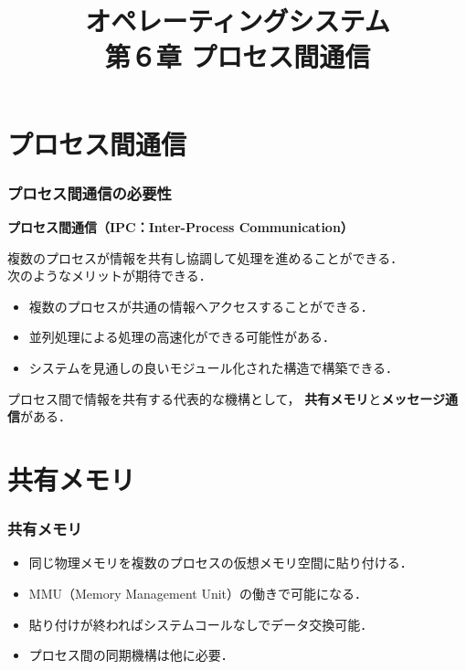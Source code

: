 \documentclass{beamer}                   %
\begin{document}
\title[OS]{オペレーティングシステム\\第６章 プロセス間通信}
\date{}

\begin{frame}
  \titlepage
\end{frame}


\section{プロセス間通信}
\begin{frame}
  \frametitle{プロセス間通信の必要性}

{\bf プロセス間通信（IPC：Inter-Process Communication）}

複数のプロセスが情報を共有し協調して処理を進めることができる．\\
次のようなメリットが期待できる．

\begin{itemize}
\item 複数のプロセスが共通の情報へアクセスすることができる．
\item 並列処理による処理の高速化ができる可能性がある．
\item システムを見通しの良いモジュール化された構造で構築できる．
\end{itemize}

プロセス間で情報を共有する代表的な機構として，
{\bf 共有メモリ}と{\bf メッセージ通信}がある．
\end{frame}

\section{共有メモリ}
\begin{frame}
  \frametitle{共有メモリ}
  \begin{itemize}
  \item 同じ物理メモリを複数のプロセスの仮想メモリ空間に貼り付ける．
  \item MMU（Memory Management Unit）の働きで可能になる．
  \item 貼り付けが終わればシステムコールなしでデータ交換可能．
  \item プロセス間の同期機構は他に必要．
  \end{itemize}
\end{frame}
\end{document}
